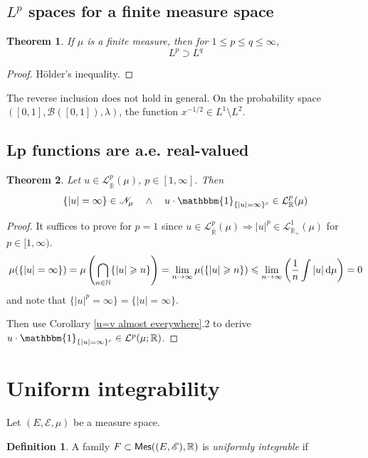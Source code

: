 \documentclass[11pt, a4paper, openany]{book}
\newtheorem{thm}{Theorem}\newtheorem{lem}{Lemma}\newtheorem{crl}{Corollary}
\theoremstyle{definition}
\newtheorem{define}{Definition}\newtheorem{exam}{Example}\newtheorem{remark}{Remark}
\newcommand{\cat}[1]{\textup{\textsf{#1}}}
\begin{document}
\subsection{\texorpdfstring{$L^p$}{Lp} spaces for a finite measure space}
    \begin{thm}\label{antitonicity of Lp spaces}
        If $\mu$ is a finite measure, then for $1\leqslant p\leqslant q\leqslant \infty$,
        \[
            L^p\supset L^q
        \]
    \end{thm}
    \begin{proof}
        H\"{o}lder's inequality.
    \end{proof}
    The reverse inclusion does not hold in general. On the probability space $([0,1],\mathscr{B}([0,1]),\lambda)$, the function $x^{-1/2}\in L^1\setminus L^2$.
\subsection{Lp functions are a.e. real-valued}
    \begin{thm}\label{integrable functions are a.e. real valued}
        Let $u\in\mathcal{L}^p_{\overline{\mathbb{R}}}(\mu)$, $p\in[1,\infty]$. Then
        \[
            \{|u|= \infty\}\in\mathscr{N}_\mu\quad\wedge\quad  u\cdot\mathbbm{1}_{\{|u|= \infty\}^c}\in\mathcal{L}^p_{\mathbb{R}}(\mu)
        \]
    \end{thm}
    \begin{proof}
        It suffices to prove for $p=1$ since $u\in\mathcal{L}^p_{\overline{\mathbb{R}}}(\mu)\Longrightarrow |u|^p\in\mathcal{L}^1_{\overline{\mathbb{R}}_+}(\mu)$ for $p\in[1,\infty)$.
        \[\mu(\{|u|= \infty\})=\mu\left(\bigcap_{n\in\mathbb{N}}\{|u|\geqslant n\}\right)=\lim_{n\to\infty}\mu(\{|u|\geqslant n\})\leqslant\lim_{n\to\infty}\left(\frac{1}{n}\int|u|\odif \mu\right)=0\]
        and note that $\{|u|^p=\infty\}=\{|u|=\infty\}$.
        \par Then use Corollary \ref{u=v almost everywhere}.2 to derive $u\cdot\mathbbm{1}_{\{|u|= \infty\}^c}\in\mathcal{L}^p(\mu;\mathbb{R})$.
    \end{proof}
\section{Uniform integrability}
    Let $(E,\mathscr{E},\mu)$ be a measure space.
    \begin{define}
        A family $F\subset\cat{Mes}((E,\mathscr{E}),\mathbb{R})$ is \textit{uniformly integrable} if 
    \end{define}
\end{document}
